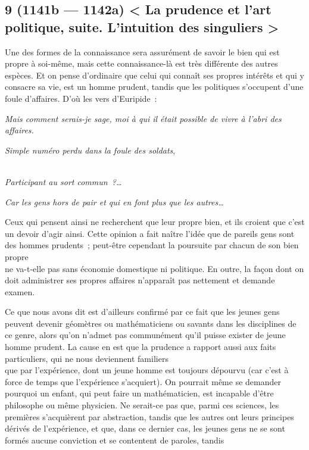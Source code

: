 \documentclass[french,twoside]{book} %
\begin{document}
\subsection[{9 (1141b — 1142a) < La prudence et l’art politique, suite. L’intuition des singuliers >}]{9 (1141b — 1142a) < La prudence et l’art politique, suite. L’intuition des singuliers >}
\noindent Une des formes de la connaissance sera assurément de savoir le bien qui est propre à soi-même, mais cette connaissance-là est très différente des autres espèces. Et on pense  d’ordinaire que celui qui connaît ses propres intérêts et qui y consacre sa vie, est un homme prudent, tandis que les politiques s’occupent d’une foule d’affaires. D’où les vers d’Euripide :\par
 {\itshape Mais comment serais-je sage, moi à qui il était possible de vivre à l’abri des affaires.} \par
{\itshape Simple numéro perdu dans la foule des soldats}, \par
 \\
 {\itshape Participant au sort commun ?…} \par
 {\itshape Car les gens hors de pair et qui en font plus que les autres…} \par
Ceux qui pensent ainsi ne recherchent que leur propre bien, et ils croient que c’est un devoir d’agir ainsi. Cette opinion a fait naître l’idée que de pareils gens sont des hommes prudents ; peut-être cependant la poursuite par chacun de son bien propre \\
ne va-t-elle pas sans économie domestique ni politique. En outre, la façon dont on doit administrer ses propres affaires n’apparaît pas nettement et demande examen.\par
Ce que nous avons dit est d’ailleurs confirmé par ce fait que les jeunes gens peuvent devenir géomètres ou mathématiciens ou savants dans les disciplines de ce genre, alors qu’on n’admet pas communément qu’il puisse exister de jeune homme prudent. La cause en est que la prudence a rapport aussi aux faits particuliers, qui ne nous deviennent familiers \\
que par l’expérience, dont un jeune homme est toujours dépourvu (car c’est à force de temps que l’expérience s’acquiert). On pourrait même se demander pourquoi un enfant, qui peut faire un mathématicien, est incapable d’être philosophe ou même physicien. Ne serait-ce pas que, parmi ces sciences, les premières s’acquièrent par abstraction, tandis que les autres ont leurs principes dérivés de l’expérience, et que, dans ce dernier cas, les jeunes gens ne se sont formés aucune conviction et se contentent de paroles, tandis \\
\end{document}
